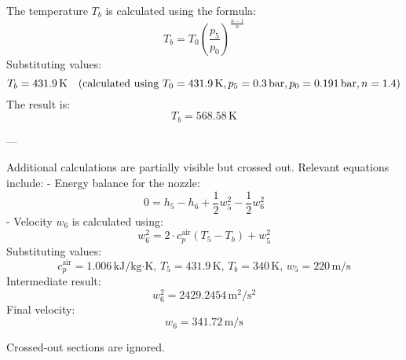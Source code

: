 The temperature \( T_b \) is calculated using the formula:  
\[
T_b = T_0 \left( \frac{p_5}{p_0} \right)^{\frac{n-1}{n}}
\]  
Substituting values:  
\[
T_b = 431.9 \, \text{K} \quad \text{(calculated using \( T_0 = 431.9 \, \text{K}, p_5 = 0.3 \, \text{bar}, p_0 = 0.191 \, \text{bar}, n = 1.4 \))}
\]  
The result is:  
\[
T_b = 568.58 \, \text{K}
\]

---

Additional calculations are partially visible but crossed out. Relevant equations include:  
- Energy balance for the nozzle:  
\[
0 = h_5 - h_6 + \frac{1}{2} w_5^2 - \frac{1}{2} w_6^2
\]  
- Velocity \( w_6 \) is calculated using:  
\[
w_6^2 = 2 \cdot c_p^{\text{air}} (T_5 - T_b) + w_5^2
\]  
Substituting values:  
\[
c_p^{\text{air}} = 1.006 \, \text{kJ/kg·K}, \, T_5 = 431.9 \, \text{K}, \, T_b = 340 \, \text{K}, \, w_5 = 220 \, \text{m/s}
\]  
Intermediate result:  
\[
w_6^2 = 2429.2454 \, \text{m}^2/\text{s}^2
\]  
Final velocity:  
\[
w_6 = 341.72 \, \text{m/s}
\]  

Crossed-out sections are ignored.